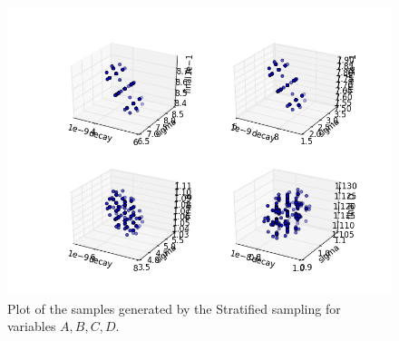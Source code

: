  \begin{figure}[h!]
  \centering
  \includegraphics[scale=0.7]{pics/samplesROM_SparseGrid.png}
  \caption{Plot of the samples generated by the Stratified sampling for variables $A,B,C,D$.}
  \label{fig:samplesROMSparseGridPlotLine}
 \end{figure}








